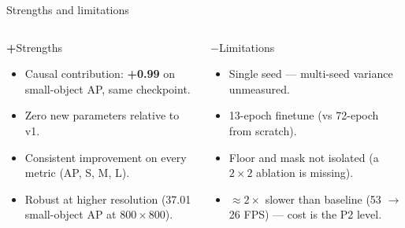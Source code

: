 \documentclass[aspectratio=169,11pt]{beamer}
\begin{document}
\begin{frame}{Strengths and limitations}
    \begin{columns}[T]
        \begin{block}{\color{white}\textbf{+}\hspace{0.5em}Strengths}
            \begin{itemize}\setlength\itemsep{0.3em}
                \item Causal contribution: \textbf{+0.99} on small-object AP, same checkpoint.
                \item Zero new parameters relative to v1.
                \item Consistent improvement on every metric (AP, S, M, L).
                \item Robust at higher resolution (37.01 small-object AP at $800{\times}800$).
            \end{itemize}
        \end{block}

        \begin{block}{\color{white}\textbf{$-$}\hspace{0.5em}Limitations}
            \begin{itemize}\setlength\itemsep{0.3em}
                \item Single seed — multi-seed variance unmeasured.
                \item 13-epoch finetune (vs 72-epoch from scratch).
                \item Floor and mask not isolated (a $2{\times}2$ ablation is missing).
                \item ${\approx}2{\times}$ slower than baseline (53 $\to$ 26 FPS) — cost is the P2 level.
            \end{itemize}
        \end{block}
    \end{columns}
\end{frame}
\end{document}
